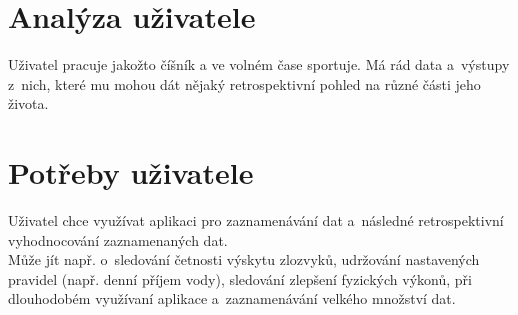 \documentclass[12pt, titlepage]{article}
\begin{document}
\section{Analýza uživatele}
Uživatel pracuje jakožto číšník a ve volném čase sportuje. Má rád data a~výstupy z~nich, které mu mohou dát nějaký retrospektivní pohled na různé části jeho života. 




\section{Potřeby uživatele}
Uživatel chce využívat aplikaci pro zaznamenávání dat a~následné retrospektivní vyhodnocování zaznamenaných dat.\\
Může jít např. o~sledování četnosti výskytu zlozvyků, udržování nastavených pravidel (např. denní příjem vody), sledování zlepšení fyzických výkonů,  při dlouhodobém využívaní aplikace a~zaznamenávání velkého množství dat.
\end{document}
